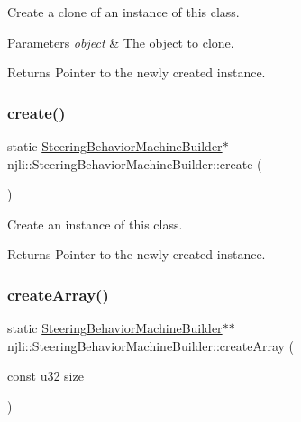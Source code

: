 Create a clone of an instance of this class.


\begin{DoxyParams}{Parameters}
{\em object} & The object to clone.\\
\hline
\end{DoxyParams}
\begin{DoxyReturn}{Returns}
Pointer to the newly created instance. 
\end{DoxyReturn}
\mbox{\label{classnjli_1_1_steering_behavior_machine_builder_ac7ee8b61a32009690b6a09b2f654c846}} 
\subsubsection{\texorpdfstring{create()}{create()}}
{\footnotesize\ttfamily static \mbox{\hyperlink{classnjli_1_1_steering_behavior_machine_builder}{Steering\+Behavior\+Machine\+Builder}}$\ast$ njli\+::\+Steering\+Behavior\+Machine\+Builder\+::create (\begin{DoxyParamCaption}{ }\end{DoxyParamCaption})\hspace{0.3cm}{\ttfamily [static]}}

Create an instance of this class.

\begin{DoxyReturn}{Returns}
Pointer to the newly created instance. 
\end{DoxyReturn}
\mbox{\label{classnjli_1_1_steering_behavior_machine_builder_a60d1b7890a0bcca4aa4e02ee2873083a}} 
\subsubsection{\texorpdfstring{create\+Array()}{createArray()}}
{\footnotesize\ttfamily static \mbox{\hyperlink{classnjli_1_1_steering_behavior_machine_builder}{Steering\+Behavior\+Machine\+Builder}}$\ast$$\ast$ njli\+::\+Steering\+Behavior\+Machine\+Builder\+::create\+Array (\begin{DoxyParamCaption}\item[{const \mbox{\hyperlink{_util_8h_a10e94b422ef0c20dcdec20d31a1f5049}{u32}}}]{size }\end{DoxyParamCaption})\hspace{0.3cm}{\ttfamily [static]}}

